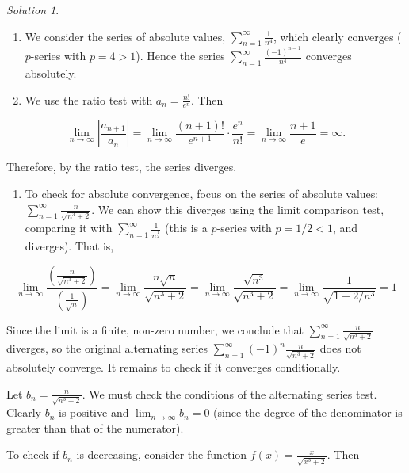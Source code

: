 \documentclass[
]{book}
\providecommand{\tightlist}{%
  \setlength{\itemsep}{0pt}\setlength{\parskip}{0pt}}
\theoremstyle{definition}
\theoremstyle{definition}
\theoremstyle{definition}
\theoremstyle{definition}
\theoremstyle{remark}
\newtheorem*{solution}{Solution}
\begin{document}
\begin{solution}

\begin{enumerate}
\def\labelenumi{\arabic{enumi}.}
\item
  We consider the series of absolute values, \(\displaystyle{\sum_{n=1}^\infty\frac{1}{n^4}}\), which clearly converges (\(p\)-series with \(p=4>1\)). Hence the series \(\displaystyle{\sum_{n=1}^\infty \frac{(-1)^{n-1}}{n^4}}\) converges absolutely.
\item
  We use the ratio test with \(a_n = \frac{n!}{e^n}\). Then
\end{enumerate}

\[\lim_{n\to\infty}\left|\frac{a_{n+1}}{a_n}\right| = \lim_{n\to\infty}\frac{(n+1)!}{e^{n+1}  }\cdot
\frac{e^n}{n!} = \lim_{n\to\infty}\frac{n+1}{e} = \infty.\]

Therefore, by the ratio test, the series diverges.

\begin{enumerate}
\def\labelenumi{\arabic{enumi}.}
\setcounter{enumi}{2}
\tightlist
\item
  To check for absolute convergence, focus on the series of absolute values: \(\displaystyle{\sum_{n=1}^\infty \frac{n}{\sqrt{n^3+2}}}\). We can show this diverges using the limit comparison test, comparing it with \(\displaystyle{\sum_{n=1}^\infty \frac{1}{n^{\frac{1}{2}}}}\) (this is a \(p\)-series with \(p = 1/2 <1\), and diverges). That is,
\end{enumerate}

\[
    \lim_{n\to\infty} \frac{\left(\frac{n}{\sqrt{n^3+2}}\right)}{\left(\frac{1}{\sqrt n} \right)} = \lim_{n\to\infty}\frac{n\sqrt{n}}{\sqrt{n^3+2}} =  \lim_{n\to\infty}\frac{\sqrt{n^3}}{\sqrt{n^3+2}} = \lim_{n\to\infty}\frac{1}{\sqrt{1+2/n^3}} = 1
\]

Since the limit is a finite, non-zero number, we conclude that \(\displaystyle{\sum_{n=1}^\infty \frac{n}{\sqrt{n^3+2}}}\) diverges, so the original alternating series \(\displaystyle{\sum_{n=1}^\infty(-1)^{n} \frac{n}{\sqrt{n^3+2}}}\) does not absolutely converge. It remains to check if it converges conditionally.

Let \(b_n = \frac{n}{\sqrt{n^3+2}}\). We must check the conditions of the alternating series test. Clearly \(b_n\) is positive and \(\lim_{n\to\infty}b_n = 0\) (since the degree of the denominator is greater than that of the numerator).

To check if \(b_n\) is decreasing, consider the function \(f(x) = \frac{x}{\sqrt{x^3+2}}\). Then


\end{solution}
\end{document}
